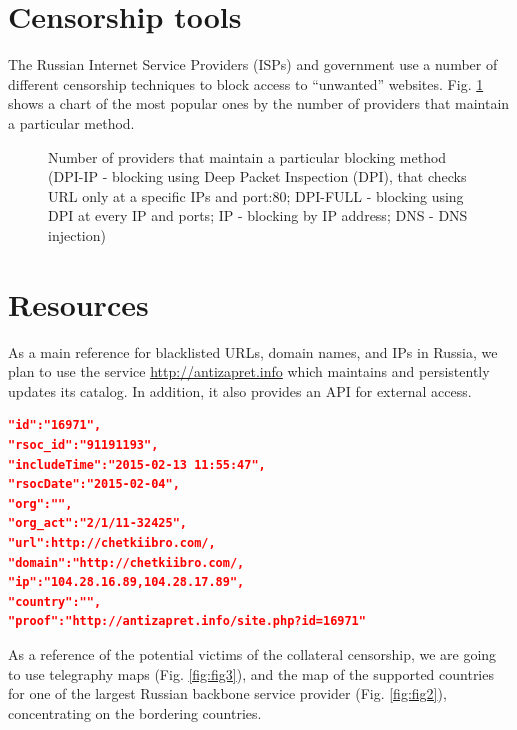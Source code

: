 \documentclass[conference]{IEEEtran}
\begin{document}
\section{Censorship tools}
The Russian Internet Service Providers (ISPs) and government use a number of different censorship techniques to block access to ``unwanted'' websites. 
Fig. \ref{fig:fig1} shows a chart of the most popular ones by the number of providers that maintain a particular method.
\begin{figure}[H]
\centering
{}
\caption{Number of providers that maintain a particular blocking method (DPI-IP - blocking using Deep Packet Inspection (DPI), that checks URL only at a specific IPs and port:80; DPI-FULL - blocking using DPI at every IP and ports; IP - blocking by IP address; DNS - DNS injection)}
\label{fig:fig1}
\end{figure}

\section{Resources}
\indent As a main reference for blacklisted URLs, domain names, and IPs in Russia, we plan to use the service \url{http://antizapret.info} which maintains and persistently updates its catalog. 
In addition, it also provides an API for external access. 

\begin{lstlisting}[language=json,firstnumber=1,caption={An example of the possible output from requesting
\url{http://api.antizapret.info/all.php?type=json}}, label=listing1, frame=single] 
"id":"16971",
"rsoc_id":"91191193",
"includeTime":"2015-02-13 11:55:47",
"rsocDate":"2015-02-04",
"org":"",
"org_act":"2/1/11-32425",
"url":http://chetkiibro.com/,
"domain":"http://chetkiibro.com/,
"ip":"104.28.16.89,104.28.17.89",
"country":"",
"proof":"http://antizapret.info/site.php?id=16971"
\end{lstlisting}
As a reference of the potential victims of the collateral censorship, we are going to use telegraphy maps (Fig. \ref{fig:fig3}), and the map of the supported countries for one of the largest Russian backbone service provider (Fig. \ref{fig:fig2}), concentrating on the bordering countries. 
\end{document}
